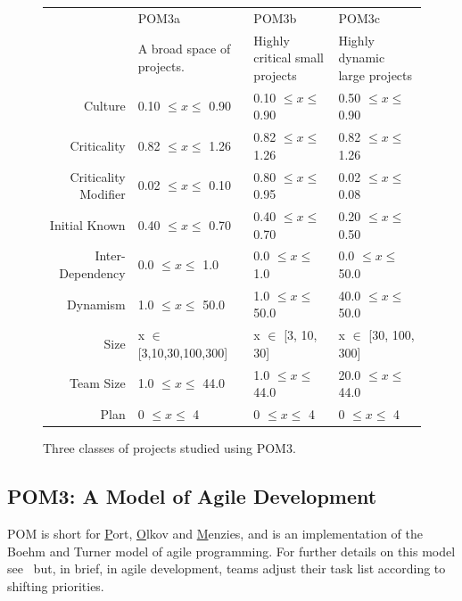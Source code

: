 \documentclass[10pt,journal,compsoc]{IEEEtran}
\begin{document}
\begin{figure}%
\footnotesize
\begin{center}
    \begin{tabular}{r|p{1.5in}|p{1.5in}|p{1.5in}}
                     & POM3a                         & POM3b             &POM3c       \\ 
                             & A broad space of projects. & Highly critical small projects& Highly dynamic large projects\\\hline
        Culture              & 0.10 $\leq x \leq$ 0.90       & 0.10 $\leq x \leq$ 0.90  & 0.50 $\leq x \leq$ 0.90  \\ 
        Criticality          & 0.82 $\leq x \leq$ 1.26       & 0.82 $\leq x \leq$ 1.26   & 0.82 $\leq x \leq$ 1.26  \\ 
        Criticality Modifier & 0.02 $\leq x \leq$ 0.10       & 0.80 $\leq x \leq$ 0.95 & 0.02 $\leq x \leq$ 0.08   \\ 
        Initial Known        & 0.40 $\leq x \leq$ 0.70       & 0.40 $\leq x \leq$ 0.70  & 0.20 $\leq x \leq$ 0.50  \\ 
        Inter-Dependency     & 0.0   $\leq x \leq$ 1.0       & 0.0   $\leq x \leq$ 1.0  & 0.0   $\leq x \leq$ 50.0 \\ 
        Dynamism             & 1.0   $\leq x \leq$ 50.0      & 1.0   $\leq x \leq$ 50.0  & 40.0   $\leq x \leq$ 50.0 \\ 
        Size                 & x $\in$ [3,10,30,100,300] & x $\in$ [3, 10, 30]     & x $\in$ [30, 100, 300]   \\ 
        Team Size            & 1.0 $\leq x \leq$ 44.0        & 1.0 $\leq x \leq$ 44.0  & 20.0 $\leq x \leq$ 44.0    \\ 
        Plan                 & 0 $\leq x \leq$ 4             & 0 $\leq x \leq$ 4    & 0 $\leq x \leq$ 4       
\end{tabular}
\end{center}

\caption{Three classes of projects studied using POM3. }\label{fig:POM3abcd}
\end{figure}




\subsection{POM3: A Model of Agile Development}\label{sec:pom3pom3}
POM is short for \underline{P}ort,
\underline{O}lkov and \underline{M}enzies, and is an
implementation of the Boehm and Turner model of
agile programming. For further
details on this model 
see~\cite{port08,1204376,turner03} but, in brief, in agile development, 
teams adjust
their task list according to shifting priorities.
\end{document}
